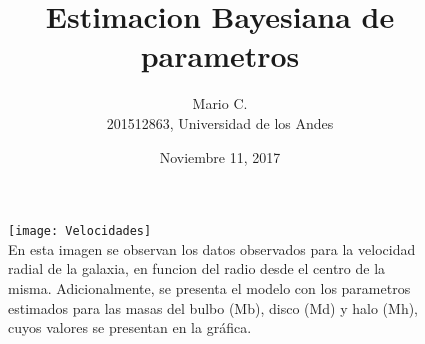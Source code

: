 \documentclass{article}
\begin{document}
\begin{center}

  \title{Estimacion Bayesiana de parametros}
\date{Noviembre 11, 2017}
\author{Mario C.\\ 201512863, Universidad de los Andes}
\maketitle
  
  \begin{figure}[t]
    \texttt{[image: Velocidades]}
    \centering
    \\
    En esta imagen se observan los datos observados para la velocidad radial de la galaxia, en funcion del radio desde el centro de la misma. Adicionalmente, se presenta el modelo con los parametros estimados para las masas del bulbo (Mb), disco (Md) y halo (Mh), cuyos valores se presentan en la gráfica.
  \end{figure}
 
\end{center}
\end{document}
